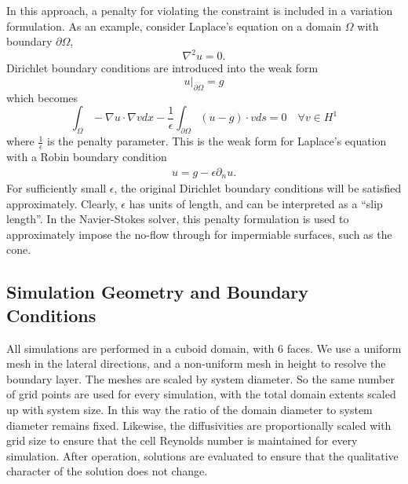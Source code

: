 In this approach, a penalty for violating the constraint is included in
a variation formulation. As an example, consider Laplace's equation on a
domain $\Omega$ with boundary $\partial\Omega$, 
\begin{equation}
 \nabla^2 u = 0. 
\end{equation}
Dirichlet boundary conditions are introduced into the weak form
\begin{equation}
 u|_{\partial \Omega} = g
\end{equation}
which becomes 
\begin{equation}
\int_{\Omega}  - \nabla u \cdot \nabla v dx - \frac{1}{\epsilon}
 \int_{\partial \Omega} (u-g) \cdot v ds = 0 \quad \forall v \in H^1
\end{equation}
where $\frac{1}{\epsilon}$ is the penalty parameter. This is the weak
form for Laplace's equation with a Robin boundary condition 
\begin{align}
 u = g - \epsilon \partial_n u. 
\end{align}
For sufficiently small $\epsilon$, the original Dirichlet boundary
conditions will be satisfied approximately. Clearly, $\epsilon$ has
units of length, and can be interpreted as a ``slip length''. In the
Navier-Stokes solver, this penalty formulation is used to approximately
impose the no-flow through for impermiable surfaces, such as the
cone.


\subsection{Simulation Geometry and Boundary Conditions}
\label{sec:bc}

%
%

All simulations are performed in a cuboid domain, with 6 faces. We
use a uniform mesh in the lateral directions, and a non-uniform mesh
in height to resolve the boundary layer. The meshes are scaled by system
diameter. So the same number of grid points are used for every
simulation, with the total domain extents scaled up with system size. In
this way the ratio of the domain diameter to system diameter remains
fixed. Likewise, the diffusivities are proportionally scaled with grid
size to ensure that the cell Reynolds number is maintained for
every simulation. After operation, solutions are evaluated to ensure
that the qualitative character of the solution does not change. 


